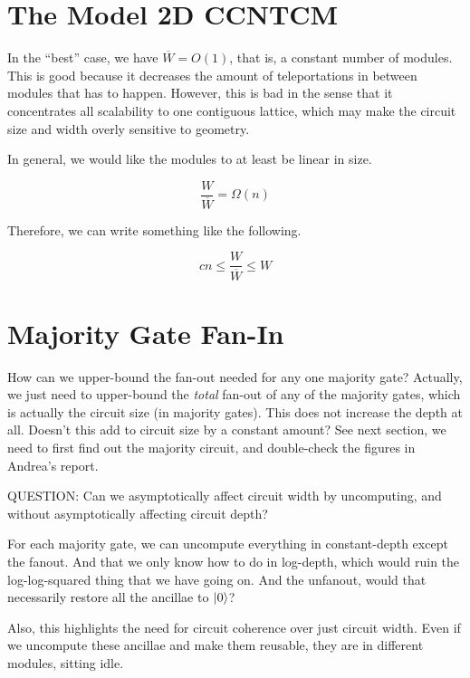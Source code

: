 \documentclass{article}
\begin{document}
\section{The Model 2D CCNTCM}

In the ``best'' case, we have $\overline{W} = O(1)$, that is, a
constant number of modules. This is good because it decreases the
amount of teleportations in between modules that has to happen.
However, this is bad in the sense that it concentrates all
scalability to one contiguous lattice, which may make the circuit
size and width overly sensitive to geometry.

In general, we would like the modules to at least be linear in
size.

\begin{equation}
\frac{W}{\overline{W}} = \Omega(n)
\end{equation}

Therefore, we can write something like the following.

\begin{equation}
cn \le \frac{W}{\overline{W}} \le W
\end{equation}

\section{Majority Gate Fan-In}

How can we upper-bound the fan-out needed for any one majority gate?
Actually, we just need to upper-bound the \emph{total} fan-out of any
of the majority gates, which is actually the circuit size (in
majority gates). This does not increase the depth at all.
Doesn't this add to circuit size by a constant amount? See next section,
we need to first find out the majority circuit, and double-check the
figures in Andrea's report.

QUESTION: Can we asymptotically affect circuit width by uncomputing,
and without asymptotically affecting circuit depth?

For each majority gate, we can uncompute everything in constant-depth
except the fanout. And that we only know how to do in log-depth,
which would ruin the log-log-squared thing that we have going on. And
the unfanout, would that necessarily restore all the ancillae to
$\left\vert{0}\right\rangle$?

Also, this highlights the need for circuit coherence over just
circuit width. Even if we uncompute these ancillae and make them
reusable, they are in different modules, sitting idle.
\end{document}
